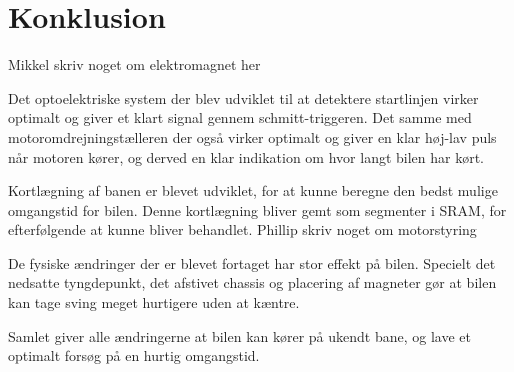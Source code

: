 

\section{Konklusion}


Mikkel skriv noget om elektromagnet her


Det optoelektriske system der blev udviklet til at detektere startlinjen virker optimalt og giver et klart signal gennem schmitt-triggeren. Det samme med motoromdrejningstælleren der også virker optimalt og giver en klar høj-lav puls når motoren kører, og derved en klar indikation om hvor langt bilen har kørt.

Kortlægning af banen er blevet udviklet, for at kunne beregne den bedst mulige omgangstid for bilen.
Denne kortlægning bliver gemt som segmenter i SRAM, for efterfølgende at kunne bliver behandlet.
Phillip skriv noget om motorstyring

De fysiske ændringer der er blevet fortaget har stor effekt på bilen. Specielt det nedsatte tyngdepunkt, det afstivet chassis og placering af magneter gør at bilen kan tage sving meget hurtigere uden at kæntre.

Samlet giver alle ændringerne at bilen kan kører på ukendt bane, og lave et optimalt forsøg på en hurtig omgangstid.
